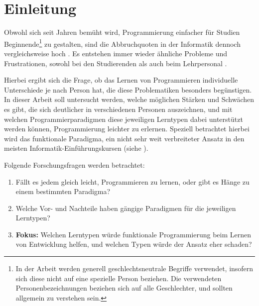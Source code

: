 \clearpage
\section{Einleitung}
\label{sec:intro}

Obwohl sich seit Jahren bemüht wird, Programmierung einfacher für Studien Beginnende\footnote{In der Arbeit werden generell geschlechtsneutrale Begriffe verwendet, insofern sich diese nicht auf eine spezielle Person beziehen. Die verwendeten Personenbezeichnungen beziehen sich auf alle Geschlechter, und sollten allgemein zu verstehen sein.} zu gestalten, sind die Abbruchquoten in der Informatik dennoch vergleichsweise hoch \cite{dhzw}.
Es entstehen immer wieder ähnliche Probleme und Frustrationen, sowohl bei den Studierenden als auch beim Lehrpersonal \cite{mcdonald}.

Hierbei ergibt sich die Frage, ob das Lernen von Programmieren individuelle Unterschiede je nach Person hat, die diese Problematiken besonders begünstigen. In dieser Arbeit soll untersucht werden, welche möglichen Stärken und Schwächen es gibt, die sich deutlicher in verschiedenen Personen auszeichnen, und mit welchen Programmierparadigmen diese jeweiligen Lerntypen dabei unterstützt werden können, Programmierung leichter zu erlernen.
Speziell betrachtet hierbei wird das funktionale Paradigma, ein nicht sehr weit verbreiteter Ansatz in den meisten Informatik-Einführungskursen (siehe ).

Folgende Forschungsfragen werden betrachtet:

\begin{enumerate}
    \item Fällt es jedem gleich leicht, Programmieren zu lernen, oder gibt es Hänge zu einem bestimmten Paradigma?
    \item Welche Vor- und Nachteile haben gängige Paradigmen für die jeweiligen Lerntypen?
    \item \textbf{Fokus:} Welchen Lerntypen würde funktionale Programmierung beim Lernen von Entwicklung helfen, und welchen Typen würde der Ansatz eher schaden?
\end{enumerate}

